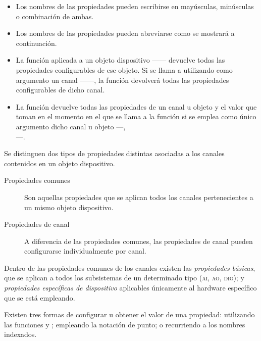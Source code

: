 \begin{itemize}
	\item Los nombres de las propiedades pueden escribirse en
		mayúsculas, minúsculas o combinación de ambas.
	\item Los nombres de las propiedades pueden abreviarse como se
		mostrará a continuación. %
	\item La función  aplicada a un objeto dispositivo
		------ devuelve todas las propiedades
		configurables de ese objeto. Si se llama a 
		utilizando como argumento un canal
		------, la función
		devolverá todas las propiedades configurables de dicho
		canal.
	\item La función  devuelve todas las propiedades de un
		canal u objeto y el valor que toman en el momento en el que
		se llama a la función si se emplea como único argumento
		dicho canal u objeto ---, \\
		---.
\end{itemize}

Se distinguen dos tipos de propiedades distintas asociadas a los canales
contenidos en un objeto dispositivo.

\begin{description}
	\item[Propiedades comunes] Son aquellas propiedades que se aplican
		todos los canales pertenecientes a un mismo objeto
		dispositivo.
	\item[Propiedades de canal] A diferencia de las propiedades
		comunes, las propiedades de canal pueden configurarse
		individualmente por canal.
\end{description}

Dentro de las propiedades comunes de los canales existen las
\emph{propiedades básicas}, que se aplican a todos los subsistemas de un
determinado tipo (\textsc{ai, ao, dio}); y \emph{propiedades específicas de
dispositivo} aplicables únicamente al hardware específico que se está
empleando.

Existen tres formas de configurar u obtener el valor de una propiedad:
utilizando las funciones  y ; empleando la notación de
punto; o recurriendo a los nombres indexados.

